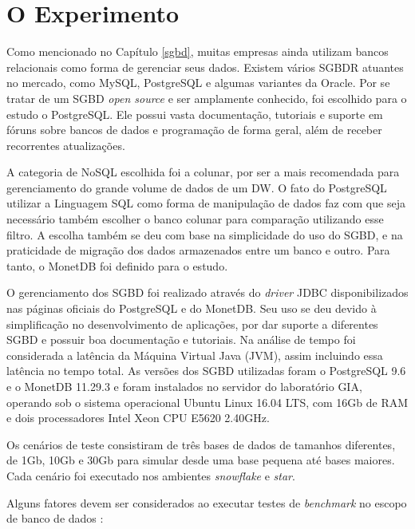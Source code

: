 \graphicspath{ {6-Experimento/} }

\chapter{O Experimento}

Como mencionado no Capítulo \ref{sgbd}, muitas empresas ainda utilizam 
bancos relacionais como forma de gerenciar seus dados. Existem vários SGBDR 
atuantes no mercado, como MySQL, PostgreSQL e algumas variantes da Oracle. 
Por se tratar de um SGBD \textit{open source} e ser amplamente 
conhecido, foi escolhido para o estudo o PostgreSQL. Ele possui vasta 
documentação, tutoriais e suporte em fóruns sobre bancos de dados e 
programação de forma geral, além de receber recorrentes atualizações. 

A categoria de NoSQL escolhida foi a colunar, por ser a mais 
recomendada para gerenciamento do grande volume de dados de um DW. 
O fato do PostgreSQL utilizar a Linguagem SQL como forma de 
manipulação de dados faz com que seja necessário também escolher 
o banco colunar para comparação utilizando esse filtro. A escolha também 
se deu com base na simplicidade do uso do SGBD, e na praticidade de 
migração dos dados armazenados entre um banco e outro. Para tanto, 
o MonetDB foi definido para o estudo.

O gerenciamento dos SGBD foi realizado através do \textit{driver} JDBC 
disponibilizados nas páginas oficiais do PostgreSQL e do MonetDB. Seu uso se deu 
devido à simplificação no desenvolvimento de aplicações, por dar suporte a 
diferentes SGBD e possuir boa documentação e tutoriais. Na análise de tempo 
foi considerada a latência da Máquina Virtual Java (JVM), assim incluindo essa 
latência no tempo total. As versões dos SGBD utilizadas 
foram o PostgreSQL 9.6 e o MonetDB 11.29.3 e foram instalados no servidor do laboratório GIA, operando sob o 
sistema operacional Ubuntu Linux 16.04 LTS, com 16Gb de RAM e dois 
processadores Intel Xeon CPU E5620 2.40GHz.

Os cenários de teste consistiram de três bases de dados de tamanhos 
diferentes, de 1Gb, 10Gb e 30Gb para simular desde uma base pequena 
até bases maiores. Cada cenário foi executado nos ambientes \textit{snowflake} e 
\textit{star}.

Alguns fatores devem ser considerados ao executar testes de \textit{benchmark} 
no escopo de banco de dados \cite{raasveldt2018fair}:

